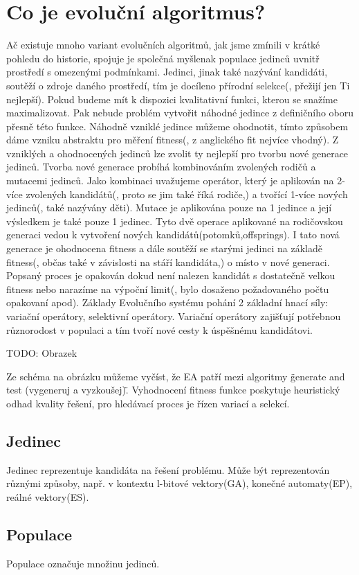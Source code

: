 \section{Co je evoluční algoritmus?}
Ač existuje mnoho variant evolučních algoritmů, jak jsme zmínili v krátké pohledu do historie, spojuje je společná myšlenak populace jedinců uvnitř prostředí s omezenými podmínkami. Jedinci, jinak také nazývání kandidáti, soutěží o zdroje daného prostředí, tím je docíleno přírodní selekce(, přežijí jen Ti nejlepší). Pokud budeme mít k dispozici kvalitativní funkci, kterou se snažíme maximalizovat. Pak nebude problém vytvořit náhodné jedince z definičního oboru přesně této funkce. Náhodně vzniklé jedince můžeme ohodnotit, tímto způsobem dáme vzniku abstraktu pro měření fitness(, z anglického fit nejvíce vhodný). Z vzniklých a ohodnocených jedinců lze zvolit ty nejlepší pro tvorbu nové generace jedinců. Tvorba nové generace probíhá kombinováním zvolených rodičů a mutacemi jedinců. Jako kombinaci uvažujeme operátor, který je aplikován na 2-více zvolených kandidátů(, proto se jim také říká rodiče,) a tvořící 1-více nových jedinců(, také nazývány děti). Mutace je aplikována pouze na 1 jedince a její výsledkem je také pouze 1 jedinec. Tyto dvě operace aplikované na rodičovskou generaci vedou k vytvoření nových kandidátů(potomků,offsprings). I tato nová generace je ohodnocena fitness a dále soutěží se starými jedinci na základě fitness(, občas také v závislosti na stáří kandidáta,) o místo v nové generaci. Popsaný proces je opakován dokud není nalezen kandidát s dostatečně velkou fitness nebo narazíme na výpoční limit(, bylo dosaženo požadovaného počtu opakovaní apod). Základy Evolučního systému pohání 2 základní hnací síly: variační operátory, selektivní operátory. Variační operátory zajišťují potřebnou různorodost v populaci a tím tvoří nové cesty k úspěšnému kandidátovi. 
  \par 
TODO: Obrazek
\par
Ze schéma na obrázku můžeme vyčíst, že EA patří mezi algoritmy \"generate and test (vygeneruj a vyzkoušej)\". Vyhodnocení fitness funkce poskytuje heuristický odhad kvality řešení, pro hledávací proces je řízen variací a selekcí. 
\subsection{Jedinec}
Jedinec reprezentuje kandidáta na řešení problému. Může být reprezentován různými způsoby, např. v kontextu l-bitové vektory(GA), konečné automaty(EP), reálné vektory(ES). 
\subsection{Populace}
Populace označuje množinu jedinců.
